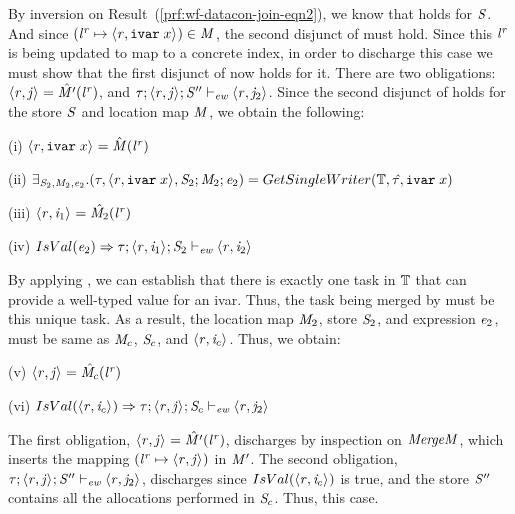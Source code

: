 \begin{bproof}
\begin{bcase}[\dregpardataconjoin{}]
\begin{enumerate}
\begin{itemize}
\begin{itemize}
\begin{itemize}
By inversion on Result~(\ref{prf:wf-datacon-join-eqn2}), we know that
 holds for $\mathit{S}$.
%
And since $({\mathit{l}}^{\mathit{r}} \mapsto \langle \mathit{r}, \texttt{ivar}\; x \rangle ^{}) \in \mathit{M}$,
the second disjunct of  must hold.
%
Since this ${\mathit{l}}^{\mathit{r}}$ is being updated to map to a concrete index,
in order to discharge this case we must show that the first disjunct of
 now holds for it.
%
There are two obligations: $\langle \mathit{r}, \mathit{j} \rangle ^{} = \hat{\mathit{M}'}({\mathit{l}}^{\mathit{r}})$,
and $\mathit{\tau};\langle \mathit{r}, \mathit{j} \rangle ^{};\mathit{S}'' \vdash_{\textit{ew}} \langle \mathit{r}, \mathit{j}_2 \rangle ^{}$.
%
Since the second disjunct of  holds for the store $\mathit{S}$ and location map $\mathit{M}$, we obtain the following:

(i) $\langle \mathit{r}, \texttt{ivar}\; x \rangle ^{} = \hat{\mathit{M}}({\mathit{l}}^{\mathit{r}})$

(ii) $\exists_{\mathit{S}_2,\mathit{M}_2,\mathit{e}_2}. (\mathit{\tau}, \langle \mathit{r}, \texttt{ivar}\; x \rangle ^{}, \mathit{S}_2;\mathit{M}_2;\mathit{e}_2) = GetSingleWriter(\mathbb{T}, \mathit{\hat{\tau}}, \texttt{ivar}\; x)$

(iii) $\langle \mathit{r}, \mathit{i}_1 \rangle ^{} = \hat{\mathit{M}_2}({\mathit{l}}^{\mathit{r}})$

(iv) $IsVal(\mathit{e}_2) \Rightarrow \mathit{\tau};\langle \mathit{r}, \mathit{i}_1 \rangle ^{};\mathit{S}_2 \vdash_{\textit{ew}} \langle \mathit{r}, \mathit{i}_2 \rangle ^{}$

%
By applying ,
we can establish that there is exactly one task in $\mathbb{T}$ that can provide
a well-typed value for an ivar.
%
Thus, the task being merged by \dregpardataconjoin{} must be this unique task.
%
As a result, the location map $\mathit{M}_2$, store $\mathit{S}_2$, and expression $\mathit{e}_2$,
must be same as $\mathit{M}_c$, $\mathit{S}_c$, and $\langle \mathit{r}, \mathit{i}_c \rangle ^{}$.
%
Thus, we obtain:

(v) $\langle \mathit{r}, \mathit{j} \rangle ^{} = \hat{\mathit{M}_c}({\mathit{l}}^{\mathit{r}})$

(vi) $IsVal(\langle \mathit{r}, \mathit{i}_c \rangle ^{}) \Rightarrow \mathit{\tau};\langle \mathit{r}, \mathit{j} \rangle ^{};\mathit{S}_c \vdash_{\textit{ew}} \langle \mathit{r}, \mathit{j}_2 \rangle ^{}$

The first obligation, $\langle \mathit{r}, \mathit{j} \rangle ^{} = \hat{\mathit{M}'}({\mathit{l}}^{\mathit{r}})$,
discharges by inspection on $\mathit{MergeM}{}$, which inserts
the mapping $({\mathit{l}}^{\mathit{r}} \mapsto \langle \mathit{r}, \mathit{j} \rangle ^{})$ in $\mathit{M}'$.
%
The second obligation, $\mathit{\tau};\langle \mathit{r}, \mathit{j} \rangle ^{};\mathit{S}'' \vdash_{\textit{ew}} \langle \mathit{r}, \mathit{j}_2 \rangle ^{}$,
discharges since $IsVal(\langle \mathit{r}, \mathit{i}_c \rangle ^{})$ is true,
and the store $\mathit{S}''$ contains all the allocations performed in $\mathit{S}_c$.
%
Thus, this case.


\end{itemize}
\end{itemize}
\end{itemize}
\end{enumerate}
\end{bcase}
\end{bproof}
